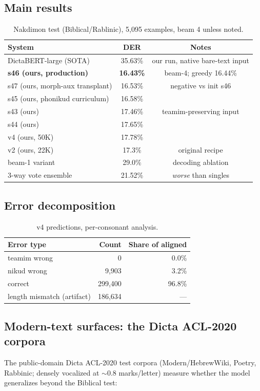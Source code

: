 \documentclass[11pt]{article}
\begin{document}
\subsection{Main results}
\begin{table}[h]
\centering
\begin{tabular}{lcc}
\toprule
System & DER & Notes \\
\midrule
DictaBERT-large (SOTA) & 35.63\% & our run, native bare-text input \\
\textbf{s46 (ours, production)} & \textbf{16.43\%} & beam-4; greedy 16.44\% \\
s47 (ours, morph-aux transplant) & 16.53\% & negative vs init s46 \\
s45 (ours, phonikud curriculum) & 16.58\% & \\
s43 (ours) & 17.46\% & teamim-preserving input \\
s44 (ours) & 17.65\% & \\
v4 (ours, 50K) & 17.78\% & \\
v2 (ours, 22K) & 17.3\% & original recipe \\
beam-1 variant & 29.0\% & decoding ablation \\
3-way vote ensemble & 21.52\% & \emph{worse} than singles \\
\bottomrule
\end{tabular}
\caption{Nakdimon test (Biblical/Rablinic), 5{,}095 examples, beam 4
unless noted.}
\end{table}

\subsection{Error decomposition}
\begin{table}[h]
\centering
\begin{tabular}{lrr}
\toprule
Error type & Count & Share of aligned \\
\midrule
teamim wrong & 0 & 0.0\% \\
nikud wrong & 9,903 & 3.2\% \\
correct & 299,400 & 96.8\% \\
length mismatch (artifact) & 186,634 & --- \\
\bottomrule
\end{tabular}
\caption{v4 predictions, per-consonant analysis.}
\end{table}

\subsection{Modern-text surfaces: the Dicta ACL-2020 corpora}
The public-domain Dicta ACL-2020 test corpora (Modern/HebrewWiki,
Poetry, Rabbinic; densely vocalized at ${\sim}$0.8 marks/letter)
measure whether the model generalizes beyond the Biblical test:
\end{document}
